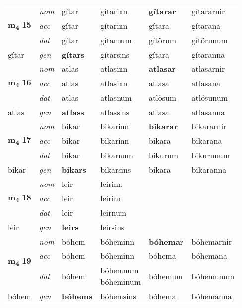 \begin{longtable}[l]{llllll}
\multirow{3}{*}{{{\textbf{m{\textsubscript{4}}} \Large{\textbf{15}}}}}  & {\footnotesize{{\textit{nom}}}} & gítar & gítarinn    & \textbf{gítarar} & gítararnir  \\*
 &  {\footnotesize{{\textit{acc}}}} & gítar  & gítarinn   & gítara  & gítarana \\*
 &  {\footnotesize{{\textit{dat}}}} & gítar & gítarnum   & gítörum & gítörunum \\*
 {\footnotesize{gítar}} &   {\footnotesize{{\textit{gen}}}} & \textbf{gítars}  & gítarsins  & gítara & gítaranna \\
\cmidrule{1-6}


\multirow{3}{*}{{{\textbf{m{\textsubscript{4}}} \Large{\textbf{16}}}}}  & {\footnotesize{{\textit{nom}}}} & atlas & atlasinn    & \textbf{atlasar} & atlasarnir  \\*
 &  {\footnotesize{{\textit{acc}}}} & atlas  & atlasinn   & atlasa  & atlasana \\*
 &  {\footnotesize{{\textit{dat}}}} & atlas & atlasnum   & atlösum & atlösunum \\*
 {\footnotesize{atlas}} &   {\footnotesize{{\textit{gen}}}} & \textbf{atlass}  & atlassins  & atlasa & atlasanna \\
\cmidrule{1-6}


\multirow{3}{*}{{{\textbf{m{\textsubscript{4}}} \Large{\textbf{17}}}}}  & {\footnotesize{{\textit{nom}}}} & bikar & bikarinn    & \textbf{bikarar} & bikararnir  \\*
 &  {\footnotesize{{\textit{acc}}}} & bikar  & bikarinn   & bikara  & bikarana \\*
 &  {\footnotesize{{\textit{dat}}}} & bikar & bikarnum   & bikurum & bikurunum \\*
 {\footnotesize{bikar}} &   {\footnotesize{{\textit{gen}}}} & \textbf{bikars}  & bikarsins  & bikara & bikaranna \\
\cmidrule{1-6}


\multirow{3}{*}{{{\textbf{m{\textsubscript{4}}} \Large{\textbf{18}}}}}  & {\footnotesize{{\textit{nom}}}} & leir & leirinn    & \textbf{} &   \\*
 &  {\footnotesize{{\textit{acc}}}} & leir  & leirinn   &   &  \\*
 &  {\footnotesize{{\textit{dat}}}} & leir & leirnum   &  &  \\*
 {\footnotesize{leir}} &   {\footnotesize{{\textit{gen}}}} & \textbf{leirs}  & leirsins  &  &  \\
\cmidrule{1-6}


\multirow{3}{*}{{{\textbf{m{\textsubscript{4}}} \Large{\textbf{19}}}}}  & {\footnotesize{{\textit{nom}}}} & bóhem & bóheminn    & \textbf{bóhemar} & bóhemarnir  \\*
 &  {\footnotesize{{\textit{acc}}}} & bóhem  & bóheminn   & bóhema  & bóhemana \\*
 &  {\footnotesize{{\textit{dat}}}} & bóhem & \specialcell{bóhemnum\\ bóheminum}   & bóhemum & bóhemunum \\*
 {\footnotesize{bóhem}} &   {\footnotesize{{\textit{gen}}}} & \textbf{bóhems}  & bóhemsins  & bóhema & bóhemanna \\
\cmidrule{1-6}



\end{longtable}
